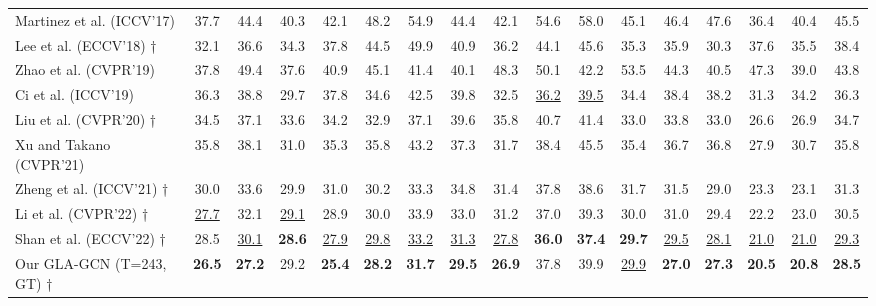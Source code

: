 \documentclass[10pt,twocolumn,letterpaper]{article}
\begin{document}
\begin{table*}[h]
{\begin{tabular}{lcccccccccccccccc}
Martinez et al. \cite{RN011} (ICCV’17)  &  37.7  &  44.4  &  40.3  &  42.1  &  48.2  &  54.9  &  44.4  &  42.1  &  54.6  &  58.0  &  45.1  &  46.4  &  47.6  &  36.4  &  40.4  &  45.5  \\
Lee et al. \cite{RN036} (ECCV’18) †  &  32.1  &  36.6  &  34.3  &  37.8  &  44.5  &  49.9  &  40.9  &  36.2  &  44.1  &  45.6  &  35.3  &  35.9  &  30.3  &  37.6  &  35.5  &  38.4  \\
Zhao et al. \cite{RN018} (CVPR’19)   &  37.8  &  49.4  &  37.6  &  40.9  &  45.1  &  41.4  &  40.1  &  48.3  &  50.1  &  42.2  &  53.5  &  44.3  &  40.5  &  47.3  &  39.0  &  43.8  \\
Ci et al. \cite{RN029} (ICCV’19)  &  36.3  &  38.8  &  29.7  &  37.8  &  34.6  &  42.5  &  39.8  &  32.5  &  \underline{36.2}  &  \underline{39.5}  &  34.4  &  38.4  &  38.2  &  31.3  &  34.2  &  36.3  \\
Liu et al. \cite{RN013} (CVPR’20) † &  34.5  &  37.1  &  33.6  &  34.2  &  32.9  &  37.1  &  39.6  &  35.8  &  40.7  &  41.4  &  33.0  &  33.8  &  33.0  &  26.6  &  26.9  &  34.7  \\
Xu and Takano \cite{RN039} (CVPR’21)  &  35.8  &  38.1  &  31.0  &  35.3  &  35.8  &  43.2  &  37.3  &  31.7  &  38.4  &  45.5  &  35.4  &  36.7  &  36.8  &  27.9  &  30.7  &  35.8  \\
Zheng et al. \cite{zheng20213d} (ICCV’21) †   &  30.0  &  33.6  &  29.9  &  31.0  &  30.2  &  33.3  &  34.8  &  31.4  &  37.8  &  38.6  &  31.7  &  31.5  &  29.0  &  23.3  &  23.1  &  31.3  \\
Li et al. \cite{li2022mhformer}  (CVPR’22) †  &  \underline{27.7}  &  32.1  &  \underline{29.1}  &  28.9  &  30.0  &  33.9  &  33.0  &  31.2  &  37.0  &  39.3  &  30.0  &  31.0  &  29.4  &  22.2  &  23.0  &  30.5  \\
Shan et al. \cite{shan2022p} (ECCV’22) † &  28.5  &  \underline{30.1}  &  \textbf{28.6}  &  \underline{27.9}  &  \underline{29.8}  &  \underline{33.2}  &  \underline{31.3}  &  \underline{27.8}  &  \textbf{36.0}  &  \textbf{37.4}  &  \textbf{29.7}  &  \underline{29.5}  &  \underline{28.1}  &  \underline{21.0}  &  \underline{21.0}  &  \underline{29.3}  \\
\rowcolor{grayrow}
Our GLA-GCN (T=243, GT) † &  \textbf{26.5}  &  \textbf{27.2}  &  29.2  &  \textbf{25.4}  &  \textbf{28.2}  &  \textbf{31.7}  &  \textbf{29.5}  &  \textbf{26.9}  &  37.8  &  39.9  &  \underline{29.9}  &  \textbf{27.0}  &  \textbf{27.3}  &  \textbf{20.5}  &  \textbf{20.8}  &  \textbf{28.5}  \\


\end{tabular}}
\end{table*}
\end{document}
